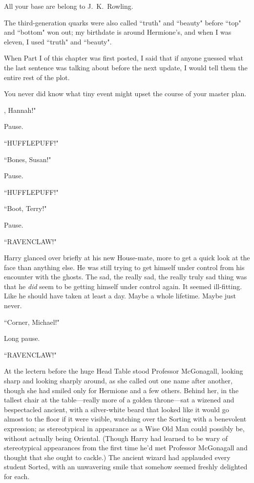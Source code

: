 
\begin{chapterOpeningAuthorNote}
All your base are belong to J.~K.~Rowling.



The third-generation quarks were also called ``truth" and ``beauty" before ``top" and ``bottom" won out; my birthdate is around Hermione's, and when I was eleven, I used ``truth" and ``beauty".

When Part I of this chapter was first posted, I said that if anyone guessed what the last sentence was talking about before the next update, I would tell them the entire rest of the plot.
\end{chapterOpeningAuthorNote}
\begin{chapterOpeningQuote}
You never did know what tiny event might upset the course of your master plan.
\end{chapterOpeningQuote}

, Hannah!"

\hplettrineextrapara
Pause.

``HUFFLEPUFF!"

``Bones, Susan!"

Pause.

``HUFFLEPUFF!"

``Boot, Terry!"

Pause.

``RAVENCLAW!"

Harry glanced over briefly at his new House-mate, more to get a quick look at the face than anything else. He was still trying to get himself under control from his encounter with the ghosts. The sad, the really sad, the really truly sad thing was that he \emph{did} seem to be getting himself under control again. It seemed ill-fitting. Like he should have taken at least a day. Maybe a whole lifetime. Maybe just never.

``Corner, Michael!"

Long pause.

``RAVENCLAW!"

At the lectern before the huge Head Table stood Professor McGonagall, looking sharp and looking sharply around, as she called out one name after another, though she had smiled only for Hermione and a few others. Behind her, in the tallest chair at the table—really more of a golden throne—sat a wizened and bespectacled ancient, with a silver-white beard that looked like it would go almost to the floor if it were visible, watching over the Sorting with a benevolent expression; as stereotypical in appearance as a Wise Old Man could possibly be, without actually being Oriental. (Though Harry had learned to be wary of stereotypical appearances from the first time he'd met Professor McGonagall and thought that she ought to cackle.) The ancient wizard had applauded every student Sorted, with an unwavering smile that somehow seemed freshly delighted for each.

